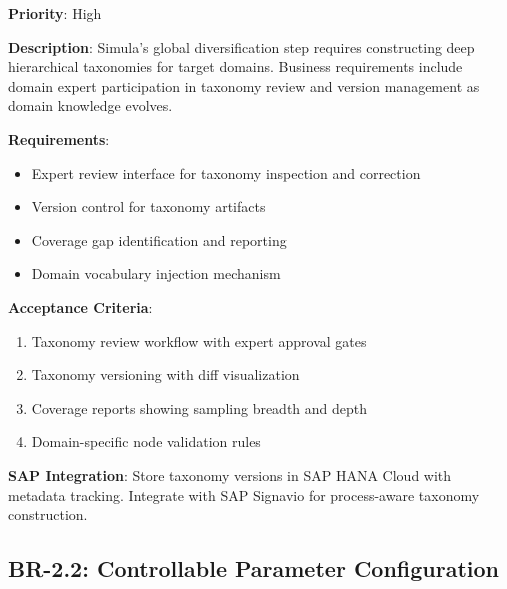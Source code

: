 \begin{tcolorbox}[colback=green!5,colframe=green!70,title=BR-2.1: Taxonomy Construction and Validation]
\textbf{Priority}: High

\textbf{Description}: Simula's global diversification step requires constructing
deep hierarchical taxonomies for target domains. Business requirements include
domain expert participation in taxonomy review and version management as domain
knowledge evolves.

\textbf{Requirements}:
\begin{itemize}
  \item Expert review interface for taxonomy inspection and correction
  \item Version control for taxonomy artifacts
  \item Coverage gap identification and reporting
  \item Domain vocabulary injection mechanism
\end{itemize}

\textbf{Acceptance Criteria}:
\begin{enumerate}
  \item Taxonomy review workflow with expert approval gates
  \item Taxonomy versioning with diff visualization
  \item Coverage reports showing sampling breadth and depth
  \item Domain-specific node validation rules
\end{enumerate}

\textbf{SAP Integration}: Store taxonomy versions in SAP HANA Cloud with metadata
tracking. Integrate with SAP Signavio for process-aware taxonomy construction.
\end{tcolorbox}

\subsection{BR-2.2: Controllable Parameter Configuration}

